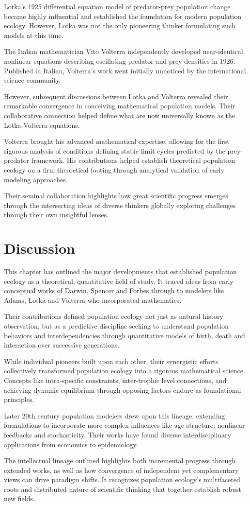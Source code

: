 Lotka's 1925 differential equation model of predator-prey population change became highly influential and established the foundation for modern population ecology. However, Lotka was not the only pioneering thinker formulating such models at this time.

The Italian mathematician Vito Volterra independently developed near-identical nonlinear equations describing oscillating predator and prey densities in 1926. Published in Italian, Volterra's work went initially unnoticed by the international science community.

However, subsequent discussions between Lotka and Volterra revealed their remarkable convergence in conceiving mathematical population models. Their collaborative connection helped define what are now universally known as the Lotka-Volterra equations. 

Volterra brought his advanced mathematical expertise, allowing for the first rigorous analysis of conditions defining stable limit cycles predicted by the prey-predator framework. His contributions helped establish theoretical population ecology on a firm theoretical footing through analytical validation of early modeling approaches.

Their seminal collaboration highlights how great scientific progress emerges through the intersecting ideas of diverse thinkers globally exploring challenges through their own insightful lenses.

\section{Discussion}

This chapter has outlined the major developments that established population ecology as a theoretical, quantitative field of study. It traced ideas from early conceptual works of Darwin, Spencer and Forbes through to modelers like Adams, Lotka and Volterra who incorporated mathematics.

Their contributions defined population ecology not just as natural history observation, but as a predictive discipline seeking to understand population behaviors and interdependencies through quantitative models of birth, death and interaction over successive generations.

While individual pioneers built upon each other, their synergistic efforts collectively transformed population ecology into a rigorous mathematical science. Concepts like intra-specific constraints, inter-trophic level connections, and achieving dynamic equilibrium through opposing factors endure as foundational principles.

Later 20th century population modelers drew upon this lineage, extending formulations to incorporate more complex influences like age structure, nonlinear feedbacks and stochasticity. Their works have found diverse interdisciplinary applications from economics to epidemiology.

The intellectual lineage outlined highlights both incremental progress through extended works, as well as how convergence of independent yet complementary views can drive paradigm shifts. It recognizes population ecology's multifaceted roots and distributed nature of scientific thinking that together establish robust new fields.
